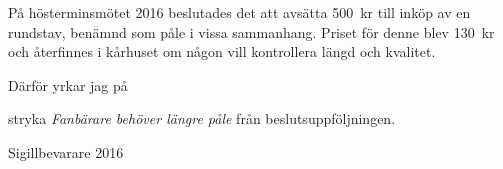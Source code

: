 \documentclass[../_main/handlingar.tex]{subfiles}
\begin{document}

På hösterminsmötet 2016 beslutades det att avsätta \SI{500}{kr} till inköp av en rundstav, benämnd som påle i vissa sammanhang. Priset för denne blev \SI{130}{kr} och återfinnes i kårhuset om någon vill kontrollera längd och kvalitet.

Därför yrkar jag på
\begin{attsatser}
    \att stryka \emph{Fanbärare behöver längre påle} från beslutsuppföljningen.
\end{attsatser}

\begin{signatures}{1}
    \mvh
	\signature{Emil Harvig}{Sigillbevarare 2016}
\end{signatures}
\end{document}
